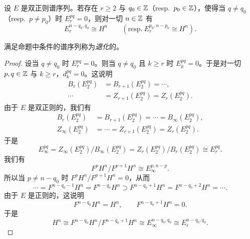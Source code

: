 \begin{proposition}\label{it:2.2.2}
设 $E$ 是双正则谱序列。若存在 $r\ge 2$ 与 $q_0\in\mathbb{Z}$（resp.\ $p_0\in\mathbb{Z}$），使得当 $q\ne q_0$（resp.\ $p\ne p_0$）时 $E_r^{pq}=0$，则对一切 $n\in\mathbb{Z}$ 有
\[
E_r^{n-q_0,q_0}\cong H^n\qquad(\text{resp.}\ E_r^{p_0,n-p_0}\cong H^n).
\]
\end{proposition}

满足命题中条件的谱序列称为\emph{退化}的。

\begin{proof}
设当 $q\ne q_0$ 时 $E_r^{pq}=0$。则当 $q\ne q_0$ 且 $k\ge r$ 时 $E_k^{pq}=0$。于是对一切 $p,q\in\mathbb{Z}$ 与 $k\ge r$，$d_k^{pq}=0$。这说明
\[
\begin{aligned}
B_r(E_2^{pq})&=B_{r+1}(E_2^{pq})=\cdots,\\
\cdots&=Z_{r+1}(E_2^{pq})=Z_r(E_2^{pq}).
\end{aligned}
\]
由于 $E$ 是双正则的，我们有
\[
\begin{aligned}
B_r(E_2^{pq})&=B_{r+1}(E_2^{pq})=\cdots=B_\infty(E_2^{pq}),\\
Z_\infty(E_2^{pq})&=\cdots=Z_{r+1}(E_2^{pq})=Z_r(E_2^{pq}).
\end{aligned}
\]
于是
\[
E_\infty^{pq}=Z_\infty(E_2^{pq})/B_\infty(E_2^{pq})=Z_r(E_2^{pq})/B_r(E_2^{pq})\cong E_r^{pq}.
\]
我们有
\[
F^pH^n/F^{p+1}H^n\cong E_\infty^{p,n-p}.
\]
所以当 $p\ne n-q_0$ 时 $F^pH^n/F^{p+1}H^n=0$，从而
\[
\cdots=F^{n-q_0-1}H^n=F^{n-q_0}H^n\supset F^{n-q_0+1}H^n=F^{n-q_0+2}H^n=\cdots.
\]
由于 $E$ 是正则的，这说明
\[
F^{n-q_0}H^n=H^n,\qquad F^{n-q_0+1}H^n=0.
\]
于是
\[
H^n\cong F^{n-q_0}H^n/F^{n-q_0+1}H^n\cong E_\infty^{n-q_0,q_0}\cong E_r^{n-q_0,q_0}.
\]
\end{proof}

